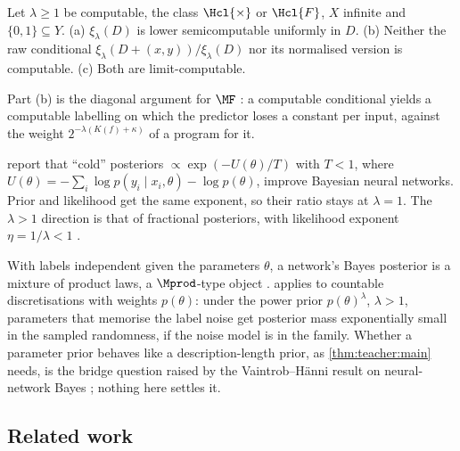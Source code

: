 \begin{proposition}\label{prop:related:computability}
Let $\lambda\ge1$ be computable, the class $\Hcl{\times}$ or $\Hcl{F}$, $X$ infinite and $\{0,1\}\subseteq Y$. (a) $\xi_\lambda(D)$ is lower semicomputable uniformly in $D$. (b) Neither the raw conditional $\xi_\lambda(D+(x,y))/\xi_\lambda(D)$ nor its normalised version is computable. (c) Both are limit-computable.
\end{proposition}

Part (b) is the diagonal argument for $\MF$ \citep[the computability proposition]{claudeSFI2026fundamentals}: a computable conditional yields a computable labelling on which the predictor loses a constant per input, against the weight $2^{-\lambda(K(f)+\kappa)}$ of a program for it.

\begin{remark}\label{rem:related:cold}
\citet{wenzel2020good} report that ``cold'' posteriors $\propto\exp(-U(\theta)/T)$ with $T<1$, where $U(\theta)=-\sum_i\log p(y_i\mid x_i,\theta)-\log p(\theta)$, improve Bayesian neural networks. Prior and likelihood get the same exponent, so their ratio stays at $\lambda=1$. The $\lambda>1$ direction is that of fractional posteriors, with likelihood exponent $\eta=1/\lambda<1$ \citep{bhattacharya2019fractional}.
\end{remark}

\begin{remark}\label{rem:related:nn}
With labels independent given the parameters $\theta$, a network's Bayes posterior is a mixture of product laws, a $\Mprod$-type object \citep[NN Bayes is function-space Bayes]{claudeSFI2026fundamentals}.  applies to countable discretisations with weights $p(\theta)$: under the power prior $p(\theta)^\lambda$, $\lambda>1$, parameters that memorise the label noise get posterior mass exponentially small in the sampled randomness, if the noise model is in the family. Whether a parameter prior behaves like a description-length prior, as \cref{thm:teacher:main} needs, is the bridge question raised by the Vaintrob--H\"anni result on neural-network Bayes \citep{vaintrobhanni2026nnbayes}; nothing here settles it.
\end{remark}

\subsection{Related work}\label{sec:related:work}

